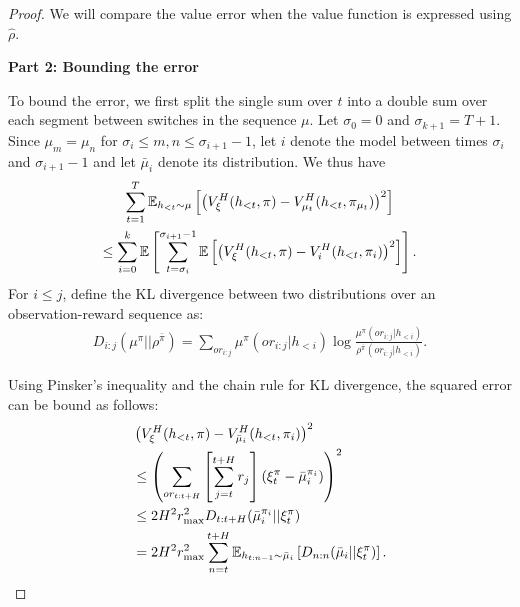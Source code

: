 \begin{proof}
    We will compare the value error when the value function is expressed using $\hat{\rho}$. 
    \hfill \newline

    \textbf{Part 2: Bounding the error}

    To bound the error, we first split the single sum over $t$ into a double sum over each segment between switches in the sequence $\mu$. Let $\sigma_0 = 0$ and $\sigma_{k+1} = T+1$. 
    Since $\mu_m = \mu_n$ for $\sigma_i \leq m, n \leq \sigma_{i+1}-1$, let $i$ denote the model between times $\sigma_i$ and $\sigma_{i+1}-1$ and let $\bar{\mu}_i$ denote its distribution. We thus have
    \begin{multline}
        \sum_{t = 1}^{T} \mathbb{E}_{h_{<t} \sim \mu} \left[ \left( V_{\xi}^{H}(h_{<t}, \pi) - V_{\mu_t}^{H}(h_{<t}, \pi_{\mu_t}) \right)^2 \right] \\
        \leq 
        \sum_{i = 0}^{k} \mathbb{E}\left[ \sum_{t=\sigma_i}^{\sigma_{i+1}-1} \mathbb{E}\left[ \left( V_{\xi}^{H}(h_{<t}, \pi) - V_{i}^{H}(h_{<t}, \pi_{i}) \right)^2 \right] \right]. \label{eqn:0}
    \end{multline}
    For $i \leq j$, define the KL divergence between two distributions over an observation-reward sequence as:
    \begin{align*}
        D_{i:j}(\mu^{\pi} || \rho^{\bar{\pi}}) = \sum_{or_{i:j}} \mu^{\pi}(or_{i:j} | h_{<i}) \log \frac{\mu^{\pi}(or_{i:j} | h_{<i})}{\rho^{\bar{\pi}}(or_{i:j} | h_{<i})}.
    \end{align*}

    Using Pinsker's inequality and the chain rule for KL divergence, the squared error can be bound as follows:
    \begin{equation}
    \begin{split}
        &\left( V_{\xi}^{H}(h_{<t}, \pi) - V_{\bar{\mu}_i}^{H}(h_{<t}, \pi_i) \right)^2 \\
        &\leq \left( \sum_{or_{t:t+H}} \left[ \sum_{j=t}^{t+H} r_j \right] \left(\xi_t^{\pi} - \bar{\mu}_i^{\pi_i}\right) \right)^2 \\
        &\leq 2 H^2 r_{\max}^2 D_{t:t+H}(\bar{\mu}_i^{\pi_i} || \xi^{\pi}_t) \\
        &= 2 H^2 r_{\max}^2 \sum_{n = t}^{t+H} \mathbb{E}_{h_{t:n-1} \sim \bar{\mu}_i} \left[ D_{n:n}(\bar{\mu}_i || \xi^{\pi}_t) \right].  \label{eqn:3}
    \end{split}
    \end{equation}


\end{proof}
